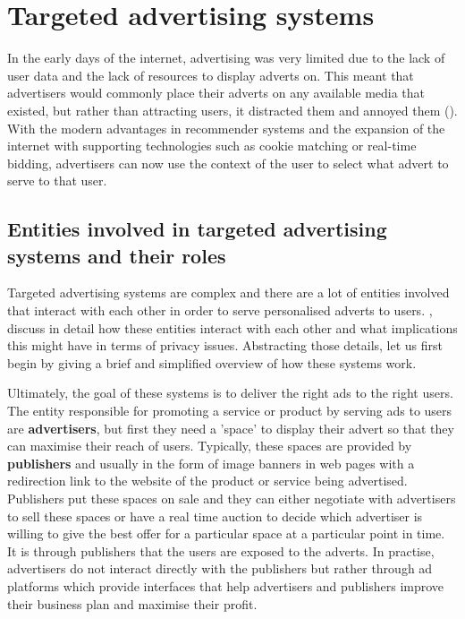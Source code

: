\documentclass{l4proj}
\begin{document}
\section{Targeted advertising systems}
\label{targeted}
In the early days of the internet, advertising was very limited due to the lack of user data and the lack of resources to display adverts on. This meant that advertisers would commonly place their adverts on any available media that existed, but rather than attracting users, it distracted them and annoyed them (\cite{earlyads}). With the modern advantages in recommender systems and the expansion of the internet with supporting technologies such as cookie matching or real-time bidding, advertisers can now use the context of the user to select what advert to serve to that user.    

\subsection{Entities involved in targeted advertising systems and their roles}
Targeted advertising systems are complex and there are a lot of entities involved that interact with each other in order to serve personalised adverts to users. \cite{Estrada-Jimenez2017}, discuss in detail how these entities interact with each other and what implications this might have in terms of privacy issues. Abstracting those details, let us first begin by giving a brief and simplified overview of how these systems work. 

Ultimately, the goal of these systems is to deliver the right ads to the right users. The entity responsible for promoting a service or product by serving ads to users are \textbf{advertisers}, but first they need a 'space' to display their advert so that they can maximise their reach of users. Typically, these spaces are provided by \textbf{publishers} and usually in the form of image banners in web pages with a redirection link to the website of the product or service being advertised. Publishers put these spaces on sale and they can either negotiate with advertisers to sell these spaces or have a real time auction to decide which advertiser is willing to give the best offer for a particular space at a particular point in time. It is through publishers that the users are exposed to the adverts. In practise, advertisers do not interact directly with the publishers but rather through ad platforms which provide interfaces that help advertisers and publishers improve their business plan and maximise their profit.
\end{document}
